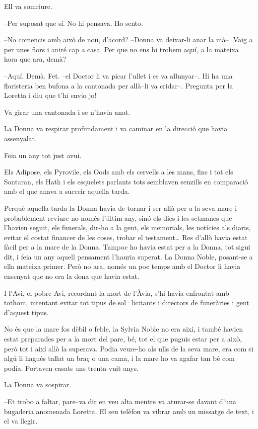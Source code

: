 Ell va somriure.

--Per suposat que sí. No hi pensava. Ho sento.

--No comencis amb això de nou, d'acord? --Donna va deixar-li anar la
mà--. Vaig a per unes flors i aniré cap a casa. Per que no ens hi trobem
aquí, a la mateixa hora que ara, demà?

--Aquí. Demà. Fet. --el Doctor li va picar l'ullet i es va allunyar--.
Hi ha una floristeria ben bufona a la cantonada per allà--li va
cridar--. Pregunta per la Loretta i diu que t'hi envio jo!

Va girar una cantonada i se n'havia anat.

La Donna va respirar profundament i va caminar en la direcció que havia
assenyalat.

Feia un any tot just avui.

Els Adipose, els Pyrovile, els Oods amb els cervells a les mans, fins i
tot els Sontaran, els Hath i els esquelets parlants tots semblaven
senzills en comparació amb el que anava a succeir aquella tarda.

Perquè aquella tarda la Donna havia de tornar i ser allà per a la seva
mare i probablement reviure no només l'últim any, sinó els dies i les
setmanes que l'havien seguit, els funerals, dir-ho a la gent, els
memorials, les notícies als diaris, evitar el costat financer de les
coses, trobar el testament\ldots{} Res d'allò havia estat fàcil per a la
mare de la Donna. Tampoc ho havia estat per a la Donna, tot sigui dit, i
feia un any aquell pensament l'hauria superat. La Donna Noble, posant-se
a ella mateixa primer. Però no ara, només un poc temps amb el Doctor li
havia ensenyat que no era la dona que havia estat.

I l'Avi, el pobre Avi, recordant la mort de l'Àvia, s'hi havia enfrontat
amb tothom, intentant evitar tot tipus de sol·licitants i directors de
funeràries i gent d'aquest tipus.

No és que la mare fos dèbil o feble, la Sylvia Noble no era així, i
també havien estat preparades per a la mort del pare, bé, tot el que
puguis estar per a això, però tot i així allò la superava. Podia
veure-ho als ulls de la seva mare, era com si algú li hagués tallat un
braç o una cama, i la mare ho va agafar tan bé com podia. Portaven
casats uns trenta-vuit anys.

La Donna va sospirar.

--Et trobo a faltar, pare--va dir en veu alta mentre va aturar-se davant
d'una bugaderia anomenada Loretta. El seu telèfon va vibrar amb un
missatge de text, i el va llegir.

